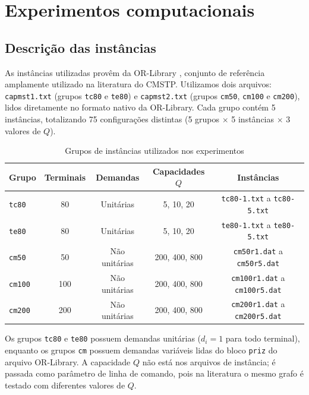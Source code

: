 \documentclass[12pt]{article}
\begin{document}
\section{Experimentos computacionais}
\label{secResultados}

\subsection{Descrição das instâncias}
\label{subSecInstancias}

As instâncias utilizadas provêm da OR-Library \cite{beasley1990}, conjunto de referência amplamente utilizado na literatura do CMSTP. Utilizamos dois arquivos: \texttt{capmst1.txt} (grupos \texttt{tc80} e \texttt{te80}) e \texttt{capmst2.txt} (grupos \texttt{cm50}, \texttt{cm100} e \texttt{cm200}), lidos diretamente no formato nativo da OR-Library. Cada grupo contém 5 instâncias, totalizando 75 configurações distintas (5 grupos $\times$ 5 instâncias $\times$ 3 valores de $Q$).

\begin{table}[!h]
\centering
\caption{Grupos de instâncias utilizados nos experimentos}
\begin{tabular}{|l|c|c|c|c|}
\hline
\multicolumn{1}{|c|}{\textbf{Grupo}} & \textbf{Terminais} & \textbf{Demandas} & \textbf{Capacidades $Q$} & \textbf{Instâncias} \\ \hline
\texttt{tc80}  & 80 & Unitárias      & 5, 10, 20       & \texttt{tc80-1.txt} a \texttt{tc80-5.txt}   \\ \hline
\texttt{te80}  & 80 & Unitárias      & 5, 10, 20       & \texttt{te80-1.txt} a \texttt{te80-5.txt}   \\ \hline
\texttt{cm50}  & 50 & Não unitárias  & 200, 400, 800   & \texttt{cm50r1.dat} a \texttt{cm50r5.dat}   \\ \hline
\texttt{cm100} & 100 & Não unitárias & 200, 400, 800   & \texttt{cm100r1.dat} a \texttt{cm100r5.dat} \\ \hline
\texttt{cm200} & 200 & Não unitárias & 200, 400, 800   & \texttt{cm200r1.dat} a \texttt{cm200r5.dat} \\ \hline
\end{tabular}
\label{tabInstancias}
\end{table}

Os grupos \texttt{tc80} e \texttt{te80} possuem demandas unitárias ($d_i = 1$ para todo terminal), enquanto os grupos \texttt{cm} possuem demandas variáveis lidas do bloco \texttt{priz} do arquivo OR-Library. A capacidade $Q$ não está nos arquivos de instância; é passada como parâmetro de linha de comando, pois na literatura o mesmo grafo é testado com diferentes valores de $Q$.
\end{document}

